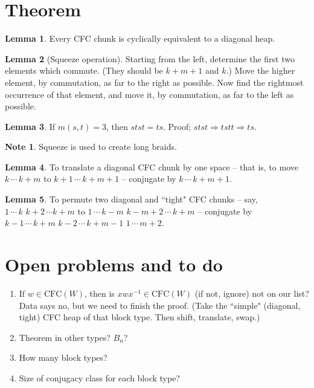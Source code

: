 \documentclass{article}
\newcommand{\CFC}{\text{CFC}(W)}
\theoremstyle{definition}
\newtheorem*{Lemma}{Lemma}
\newtheorem*{note}{Note}
\theoremstyle{theorem}
\begin{document}
\section{Theorem}
\begin{Lemma} Every CFC chunk is cyclically equivalent to a diagonal heap. \end{Lemma}
\begin{Lemma}[Squeeze operation] Starting from the left, determine the first two elements which commute. (They should be $k+m+1$ and $k$.) Move the higher element, by commutation, as far to the right as possible. Now find the rightmost occurrence of that element, and move it, by commutation, as far to the left as possible. \end{Lemma}
\begin{Lemma} If $m(s,t)=3$, then $stst = ts$. Proof; $stst \Rightarrow tstt \Rightarrow ts$. \end{Lemma}
\begin{note} Squeeze is used to create long braids. \end{note}
\begin{Lemma} To translate a diagonal CFC chunk by one space -- that is, to move $k \, \cdots \, k+m$ to $k+1 \, \cdots \, k+m+1$ -- conjugate by $k \, \cdots \, k+m+1$. \end{Lemma}
\begin{Lemma} To permute two diagonal and ``tight" CFC chunks -- say, $1 \, \cdots \, k \,\, k+2 \, \cdots k+m$ to $1 \, \cdots \, k-m \,\, k-m+2 \, \cdots \, k+m$ -- conjugate by $k-1 \, \cdots \, k+m \,\, k-2 \, \cdots \, k+m-1 \,\, 1 \, \cdots \, m+2$. \end{Lemma}


\section{Open problems and to do}
\begin{enumerate}[label=(\alph*)]
\item If $w \in \CFC$, then is $xwx^{-1} \in \CFC$ (if not, ignore) not on our list? Data says no, but we need to finish the proof.
	(Take the ``simple" (diagonal, tight) CFC heap of that block type. Then shift, translate, swap.)
\item Theorem in other types? $B_n$?
\item How many block types?
\item Size of conjugacy class for each block type?
\end{enumerate}
\end{document}
